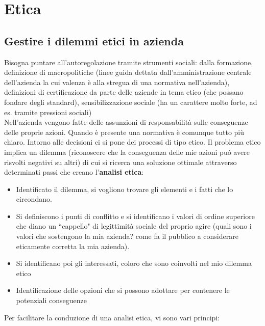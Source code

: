 \chapter{Etica}

\section{Gestire i dilemmi etici in azienda}
Bisogna puntare all'autoregolazione tramite strumenti sociali: dalla
formazione, definizione di macropolitiche (linee guida dettata
dall'amministrazione centrale dell'azienda la cui valenza \`e alla stregua
di una normativa nell'azienda), definizioni di certificazione da parte
delle aziende in tema etico (che possano fondare degli standard),
sensibilizzazione sociale (ha un carattere molto forte, ad es. tramite
pressioni sociali)\\
Nell'azienda vengono fatte delle assunzioni di responsabilit\`a sulle
conseguenze delle proprie azioni. Quando è presente una normativa è comunque 
tutto più chiaro. Intorno alle decisioni ci si pone dei
processi di tipo etico. Il problema etico implica un dilemma
(riconoscere che la conseguenza delle mie azioni pu\'o avere risvolti
negativi su altri) di cui si ricerca una soluzione ottimale attraverso
determinati passi che creano l'\textbf{analisi etica}:

\begin{itemize}

\item
  Identificato il dilemma, si vogliono trovare gli elementi e i fatti
  che lo circondano.\\
\item
  Si definiscono i punti di conflitto e si identificano i valori di
  ordine superiore che diano un ``cappello" di legittimit\`a sociale del
  proprio agire (quali sono i valori che sostengono la mia azienda? come
  fa il pubblico a considerare eticamente corretta la mia azienda).\\
\item
  Si identificano poi gli interessati, coloro che sono coinvolti nel mio
  dilemma etico\\
\item
  Identificazione delle opzioni che si possono adottare per contenere le
  potenziali conseguenze
\end{itemize}

Per facilitare la conduzione di una analisi etica, vi sono vari
principi:

